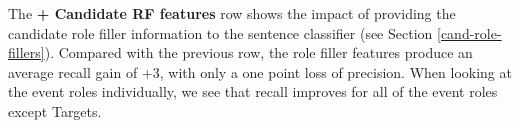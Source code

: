 

The {\bf + Candidate RF features} row shows the impact of providing the
candidate role filler information to the sentence classifier (see
Section \ref{cand-role-fillers}).  Compared with the previous row,
the role filler features produce an average recall gain of +3, with
only a one point loss of precision.  When looking at the event roles
individually, we see that recall improves for all of the event roles
except Targets.

